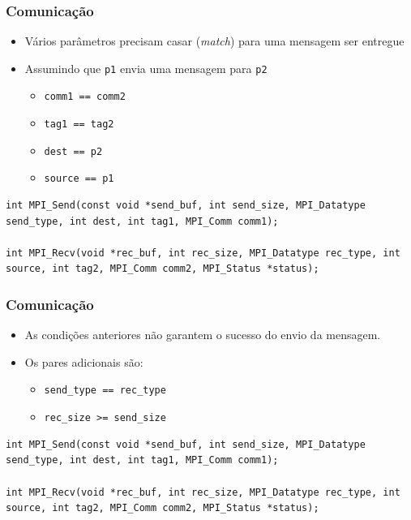 \documentclass[xcolor={usenames,dvipsnames},12pt,presentation,aspectratio=169]{beamer}
\begin{document}
\begin{frame}[fragile]
  \frametitle{Comunicação}
\begin{itemize}
  \item Vários parâmetros precisam casar (\emph{match}) para uma mensagem ser entregue
  \item Assumindo que \texttt{p1} envia uma mensagem para \texttt{p2}
  \begin{itemize}
    \item \texttt{comm1 == comm2} 
    \item \texttt{tag1 == tag2} 
    \item \texttt{dest == p2} 
    \item \texttt{source == p1} 
  \end{itemize} 
\end{itemize}
%
\begin{center}
\begin{minipage}{0.95\textwidth}
  \begin{verbatim}
int MPI_Send(const void *send_buf, int send_size, MPI_Datatype send_type, int dest, int tag1, MPI_Comm comm1);

int MPI_Recv(void *rec_buf, int rec_size, MPI_Datatype rec_type, int source, int tag2, MPI_Comm comm2, MPI_Status *status);
  \end{verbatim}
\end{minipage}
\end{center}
\end{frame}
\begin{frame}[fragile]
  \frametitle{Comunicação}
\begin{itemize}
  \item As condições anteriores não garantem o sucesso do envio da mensagem.
  \item Os pares adicionais são:
  \begin{itemize}
    \item \texttt{send_type == rec_type}
    \item \texttt{rec_size >= send_size }
  \end{itemize}
  
\end{itemize}
%
\begin{center}
\begin{minipage}{0.95\textwidth}
  \begin{verbatim}
int MPI_Send(const void *send_buf, int send_size, MPI_Datatype send_type, int dest, int tag1, MPI_Comm comm1);

int MPI_Recv(void *rec_buf, int rec_size, MPI_Datatype rec_type, int source, int tag2, MPI_Comm comm2, MPI_Status *status);
      \end{verbatim}
\end{minipage}
\end{center}
\end{frame}
\end{document}
